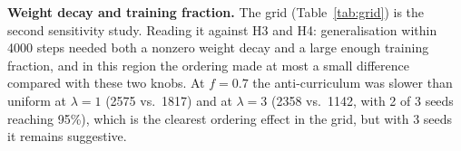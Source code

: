 \textbf{Weight decay and training fraction.} The grid (Table~\ref{tab:grid}) is the second sensitivity study. Reading it against H3 and H4: generalisation within 4000 steps needed both a nonzero weight decay and a large enough training fraction, and in this region the ordering made at most a small difference compared with these two knobs. At $f=0.7$ the anti-curriculum was slower than uniform at $\lambda=1$ (2575 vs.\ 1817) and at $\lambda=3$ (2358 vs.\ 1142, with 2 of 3 seeds reaching 95\%), which is the clearest ordering effect in the grid, but with 3 seeds it remains suggestive.
